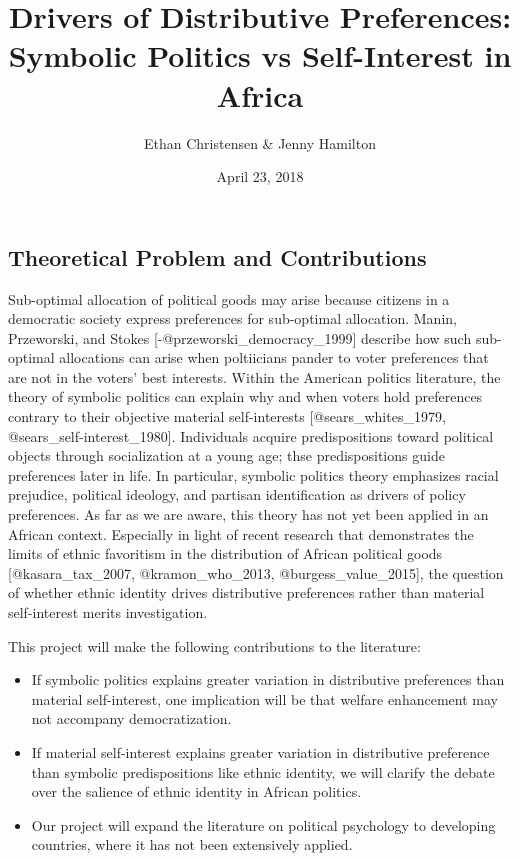 \documentclass[]{article}
\title{Drivers of Distributive Preferences: Symbolic Politics vs Self-Interest
in Africa}
\author{Ethan Christensen \& Jenny Hamilton}
\date{April 23, 2018}
\begin{document}
\maketitle

\subsection{Theoretical Problem and
Contributions}\label{theoretical-problem-and-contributions}

Sub-optimal allocation of political goods may arise because citizens in
a democratic society express preferences for sub-optimal allocation.
Manin, Przeworski, and Stokes {[}-@przeworski\_democracy\_1999{]}
describe how such sub-optimal allocations can arise when poltiicians
pander to voter preferences that are not in the voters' best interests.
Within the American politics literature, the theory of symbolic politics
can explain why and when voters hold preferences contrary to their
objective material self-interests {[}@sears\_whites\_1979,
@sears\_self-interest\_1980{]}. Individuals acquire predispositions
toward political objects through socialization at a young age; thse
predispositions guide preferences later in life. In particular, symbolic
politics theory emphasizes racial prejudice, political ideology, and
partisan identification as drivers of policy preferences. As far as we
are aware, this theory has not yet been applied in an African context.
Especially in light of recent research that demonstrates the limits of
ethnic favoritism in the distribution of African political goods
{[}@kasara\_tax\_2007, @kramon\_who\_2013, @burgess\_value\_2015{]}, the
question of whether ethnic identity drives distributive preferences
rather than material self-interest merits investigation.

This project will make the following contributions to the literature:

\begin{itemize}
\item If symbolic politics explains greater variation in distributive preferences than material self-interest, one implication will be that welfare enhancement may not accompany democratization.
\item If material self-interest explains greater variation in distributive preference than symbolic predispositions like ethnic identity, we will clarify the debate over the salience of ethnic identity in African politics.
\item Our project will expand the literature on political psychology to developing countries, where it has not been extensively applied.
\end{itemize}
\end{document}
